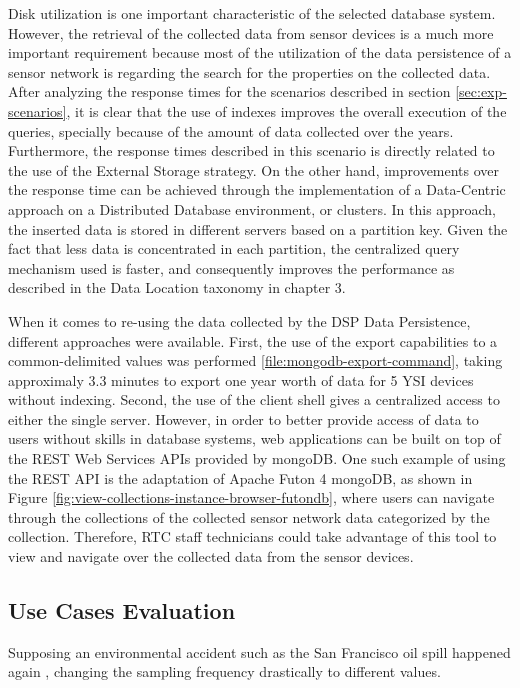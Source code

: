 Disk utilization is one important characteristic of the selected database
system. However, the retrieval of the collected data from sensor devices is
a much more important requirement because most of the utilization of the data
persistence of a sensor network is regarding the search for the properties on
the collected data. After analyzing the response times for the scenarios
described in section \ref{sec:exp-scenarios}, it is clear that the use of
indexes improves the overall execution of the queries, specially because of the
amount of data collected over the years. Furthermore, the response times
described in this scenario is directly related to the use of the External
Storage strategy. On the other hand, improvements over the response time can be
achieved through the implementation of a Data-Centric approach on a Distributed
Database environment, or clusters. In this approach, the inserted data is
stored in different servers based on a partition key. Given the fact that less
data is concentrated in each partition, the centralized query mechanism used is
faster, and consequently improves the performance as described in the Data
Location taxonomy in chapter 3.

When it comes to re-using the data collected by the DSP Data Persistence,
different approaches were available. First, the use of the export capabilities
to a common-delimited values was performed \ref{file:mongodb-export-command},
taking approximaly 3.3 minutes to export one year worth of data for 5 YSI
devices without indexing. Second, the use of the client shell gives a
centralized access to either the single server. However, in order to better
provide access of data to users without skills in database systems, web
applications can be built on top of the REST Web Services APIs \cite{http-rest}
provided by mongoDB. One such example of using the REST API is the adaptation
of Apache Futon 4 mongoDB, as shown in Figure
\ref{fig:view-collections-instance-browser-futondb}, where users can navigate
through the collections of the collected sensor network data categorized by the
collection. Therefore, RTC staff technicians could take advantage of this tool
to view and navigate over the collected data from the sensor devices.

\subsection{Use Cases Evaluation}

Supposing an environmental accident such as the San Francisco oil
  spill happened again \cite{sfbay-oilspill2009}, changing the sampling
  frequency drastically to different values. 

